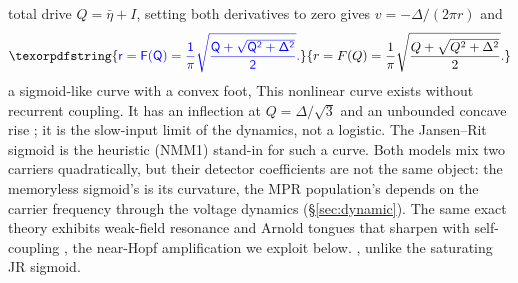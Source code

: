 \documentclass[11pt,a4paper]{article}
\providecommand{\DIFaddtex}[1]{{\protect\color{blue} \sf #1}} %
\providecommand{\DIFdeltex}[1]{{\protect\color{red} \scriptsize #1}} %
\providecommand{\DIFaddbegin}{} %
\providecommand{\DIFaddend}{} %
\providecommand{\DIFdelbegin}{} %
\providecommand{\DIFdelend}{} %
\providecommand{\DIFadd}[1]{\texorpdfstring{\DIFaddtex{#1}}{#1}} %
\providecommand{\DIFdel}[1]{\texorpdfstring{\DIFdeltex{#1}}{}} %
\begin{document}
\DIFdelend \DIFaddbegin \DIFadd{total drive
$Q=\bar\eta+I$, setting both derivatives to zero gives $v=-\Delta/(2\pi r)$ and
}\begin{equation}
\DIFadd{r=F(Q)=\frac{1}{\pi}\sqrt{\frac{Q+\sqrt{Q^2+\Delta^2}}{2}} .
\label{eq:Fmpr}
}\end{equation}\DIFaddend
\DIFdelbegin \DIFdel{a sigmoid-like curve with a convex foot, }\DIFdelend \DIFaddbegin \DIFadd{This nonlinear curve exists without recurrent coupling. It has }\DIFaddend an inflection at
$Q=\Delta/\sqrt3$ and an unbounded concave rise\DIFdelbegin \DIFdel{\cite{clusella2023}; it is the slow-input limit of the dynamics,
not a logistic. The Jansen--Rit sigmoid is the heuristic (NMM1) stand-in for such a curve. Both
models mix two carriers quadratically, but their detector coefficients are not the same
object: the memoryless sigmoid's is its curvature, the MPR population's depends on the carrier frequency through the voltage dynamics (\S\ref{sec:dynamic}). The same exact
theory exhibits weak-field resonance and Arnold tongues that sharpen with self-coupling
\cite{clusella2023,ruffini2021nmm2}, the near-Hopf amplification we exploit below. }\DIFdelend \DIFaddbegin \DIFadd{, unlike the saturating JR sigmoid.
}\DIFaddend
\end{document}
